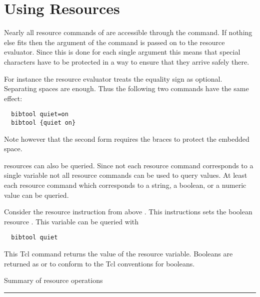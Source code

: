 \section{Using \BibTool{} Resources}\label{sec:tcl-resources}

Nearly all resource commands of \BibTool{} are accessible through the
 command. If nothing else fits then the argument of the
 command is passed on to the resource evaluator. Since
this is done for each single argument this means that special
characters have to be protected in a way to ensure that they arrive
safely there.

For instance the resource evaluator treats the equality sign as
optional. Separating spaces are enough. Thus the following two
commands have the same effect:
\begin{verbatim}
  bibtool quiet=on
  bibtool {quiet on}
\end{verbatim}
Note however that the second form requires the braces to protect the
embedded space.

\BibTool{} resources can also be queried. Since not each resource
command corresponds to a single variable not all resource commands can
be used to query values. At least each resource command which
corresponds to a string, a boolean, or a numeric value can be queried.

Consider the resource instruction from above .  This
instructions sets the boolean resource .  This variable
can be queried with
\begin{verbatim}
  bibtool quiet
\end{verbatim}
This Tcl command returns the value of the resource variable. Booleans
are returned as  or  to conform to the Tcl conventions
for booleans.

\INCOMPLETE


\begin{table}[tp]
    
  \caption{Summary of resource operations}\label{fig:tcl-rsc}
  \rule{\textwidth}{.1pt}
\end{table}





